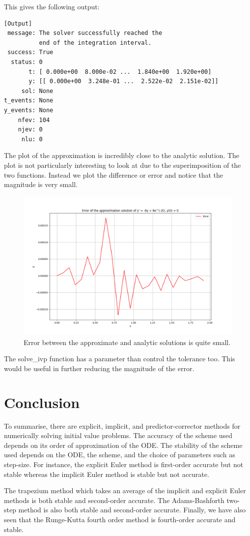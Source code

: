 \documentclass{article}
\begin{document}
This gives the following output:

\begin{verbatim}[Output]
 message: The solver successfully reached the 
          end of the integration interval.
 success: True
  status: 0
       t: [ 0.000e+00  8.000e-02 ...  1.840e+00  1.920e+00]
       y: [[ 0.000e+00  3.248e-01 ...  2.522e-02  2.151e-02]]
     sol: None
t_events: None
y_events: None
    nfev: 104
    njev: 0
     nlu: 0
\end{verbatim}

The plot of the approximation is incredibly close to the analytic solution. The plot is not particularly interesting to look at due to the superimposition of the two functions. Instead we plot the difference or error and notice that the magnitude is very small.

\begin{figure}
    \centering
    \includegraphics[width=1.0\textwidth]{images/error_python.png}
    \caption{Error between the approximate and analytic solutions is quite small.}
\end{figure}

The solve\_ivp function has a parameter than control the tolerance too. This would be useful in further reducing the magnitude of the error.

\section{Conclusion}

To summarise, there are explicit, implicit, and predictor-corrector methods for numerically solving initial value problems. The accuracy of the scheme used depends on its order of approximation of the ODE. The stability of the scheme used depends on the ODE, the scheme, and the choice of parameters such as step-size. For instance, the explicit Euler method is first-order accurate but not stable whereas the implicit Euler method is stable but not accurate. 

The trapezium method which takes an average of the implicit and explicit Euler methods is both stable and second-order accurate. The Adams-Bashforth two-step method is also both stable and second-order accurate.  Finally, we have also seen that the Runge-Kutta fourth order method is fourth-order accurate and stable.
\end{document}
